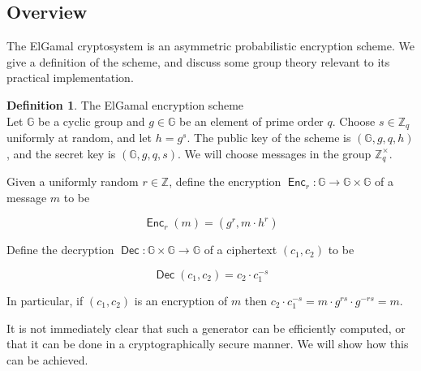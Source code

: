 \documentclass[11pt,twoside,a4paper]{article}
\DeclareMathOperator{\Enc}{\mathsf{Enc}}
\DeclareMathOperator{\Dec}{\mathsf{Dec}}
\theoremstyle{definition}
\newtheorem{definition}{Definition}[section]
\begin{document}
\subsection{Overview}
The ElGamal cryptosystem is an asymmetric probabilistic encryption scheme. We give a definition of the scheme, and discuss some group theory relevant to its practical implementation.
\begin{definition}{The ElGamal encryption scheme}\\
    Let \(\mathbb{G}\) be a cyclic group and \(g\in\mathbb{G}\) be an element of prime order \(q\). Choose \(s\in\mathbb{Z}_q\) uniformly at random, and let \(h=g^s\). The public key of the scheme is \((\mathbb{G}, g, q, h)\), and the secret key is \((\mathbb{G}, g, q, s)\). We will choose messages in the group \(\mathbb{Z}^\times_q\).

    Given a uniformly random \(r\in\mathbb{Z}\), define the encryption \(\Enc_r:\mathbb{G}\rightarrow\mathbb{G}\times\mathbb{G}\) of a message \(m\) to be
    
    \[\Enc_r(m) = (g^r, m\cdot h^r)\]

    Define the decryption \(\Dec:\mathbb{G}\times\mathbb{G}\rightarrow \mathbb{G}\) of a ciphertext \((c_1, c_2)\) to be
    
    \[\Dec(c_1,c_2)=c_2\cdot c_1^{-s}\]

    In particular, if \((c_1,c_2)\) is an encryption of \(m\) then \(c_2\cdot c_1^{-s}=m\cdot g^{rs}\cdot g^{-rs}=m\).
\end{definition}
It is not immediately clear that such a generator can be efficiently computed, or that it can be done in a cryptographically secure manner. We will show how this can be achieved.
\end{document}
